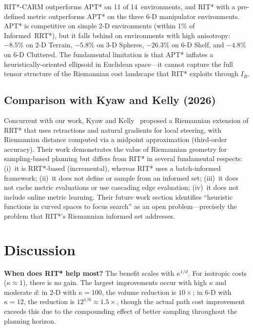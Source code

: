 \documentclass[journal]{IEEEtran}
\newcommand{\IR}{I_{\!R}}
\begin{document}
RIT*-CARM outperforms APT* on 11 of 14~environments, and RIT* with a
pre-defined metric outperforms APT* on the three 6-D manipulator
environments. APT* is competitive on simple 2-D environments (within
1\% of Informed~RRT*), but it falls behind on environments with high
anisotropy: $-8.5\%$ on 2-D Terrain, $-5.8\%$ on 3-D Spheres,
$-26.3\%$ on 6-D Shelf, and $-4.8\%$ on 6-D Cluttered. The
fundamental limitation is that APT* inflates a heuristically-oriented
ellipsoid in Euclidean space---it cannot capture the full tensor
structure of the Riemannian cost landscape that RIT* exploits through
$\IR$.

\subsection{Comparison with Kyaw and Kelly (2026)}

Concurrent with our work, Kyaw and Kelly~\cite{Kyaw2026} proposed a
Riemannian extension of RRT* that uses retractions and natural gradients
for local steering, with Riemannian distance computed via a midpoint
approximation (third-order accuracy). Their work demonstrates the
value of Riemannian geometry for sampling-based planning but differs
from RIT* in several fundamental respects:
(i)~it is RRT*-based (incremental), whereas RIT* uses a batch-informed
framework;
(ii)~it does not define or sample from an informed set;
(iii)~it does not cache metric evaluations or use cascading edge
evaluation;
(iv)~it does not include online metric learning.
Their future work section identifies ``heuristic functions in curved
spaces to focus search'' as an open problem---precisely the problem
that RIT*'s Riemannian informed set addresses.


\section{Discussion}\label{sec:discussion}

\textbf{When does RIT* help most?}
The benefit scales with $\kappa^{1/d}$. For
isotropic costs ($\kappa \approx 1$), there is no gain. The largest
improvements occur with high $\kappa$ and moderate $d$: in 2-D with
$\kappa = 100$, the volume reduction is $10\times$; in 6-D with
$\kappa = 12$, the reduction is $12^{1/6} \approx 1.5\times$,
though the actual path cost improvement exceeds this
due to the compounding effect of better sampling throughout the
planning horizon.
\end{document}
